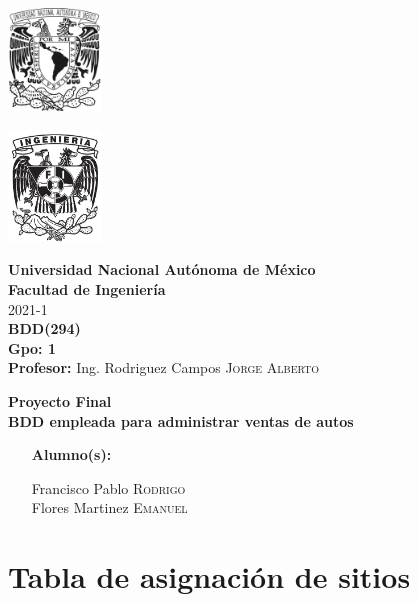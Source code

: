 \documentclass{article}
\newcommand{\coverPage}{
\thispagestyle{empty}
  \begin{minipage}[t][5cm][t]{0.2\linewidth}
    \includegraphics[width=2.5cm]{unam.jpg}

    \vspace{10cm}

    \includegraphics[width=2.5cm]{fiblack}
  \end{minipage}
  \begin{minipage}[t]{0.7\linewidth}
    \vspace{-2.5cm}
    \LARGE{\textbf{\university}}\\
    \Large{\textbf{\faculty}} \\
  
    \large{\semestre}\\[2cm]
  
    \large{\textbf{\materia (\clave)}}\\
    \large{\textbf{Gpo: \grupo}}\\[5mm]
    \large{\textbf{Profesor:} \profesor}\\ [1.5cm]
    \begin{center}
        \LARGE{\textbf{\actividad}}\\
        \LARGE{\textbf{\titulo}}\\
    \end{center}
  
    \vspace{3.3cm}
  
    \large{
      \begin{itemize}[ noitemsep, align=left ]
        \item [\textbf{Alumno(s):}] 
          \begin{flushright}
            \alumno
          \end{flushright}
      \end{itemize}
    } \vspace{1.5cm}
  
    \begin{flushright}
        \fechaEntrega%
    \end{flushright}
  \end{minipage}

\newpage
}
\begin{document}

\newcommand{\university}{Universidad Nacional Autónoma de México}
\newcommand{\faculty}{Facultad de Ingeniería}
\newcommand{\semestre}{2021-1}
\newcommand{\materia}{BDD}
\newcommand{\clave}{294}
\newcommand{\grupo}{1}
\newcommand{\profesor}{Ing. Rodriguez Campos \textsc{Jorge Alberto}}

\newcommand{\alumno}{
  Francisco Pablo \textsc{Rodrigo} \\ 
  Flores Martinez \textsc{Emanuel}   
}
\newcommand{\actividad}{Proyecto Final}
\newcommand{\titulo}{BDD empleada para administrar ventas de autos}

\newcommand{\fechaEntrega}{}

\newcommand{\codedir}{codigo}
\graphicspath{{assets/logos/}{bdd_proyecto.assets/}{modelo}}

\coverPage%



\section*{Tabla de asignación de sitios}

\newcommand{\nameTabBuilder}[1]{F\_RFP\_#1}
\newcommand{\snI}{RFP\_S1}
\newcommand{\snII}{RFP\_S2}
\newcommand{\snIII}{EFM\_S1}
\newcommand{\snIV}{EFM\_S2}
\newcommand{\pdbI}{rfpbd\_s1.fi.unam}
\newcommand{\pdbII}{rfpbd\_s2.fi.unam}
\newcommand{\pdbIII}{efmbd\_s1.fi.unam}
\newcommand{\pdbIV}{efmbd\_s2.fi.unam}
\end{document}
